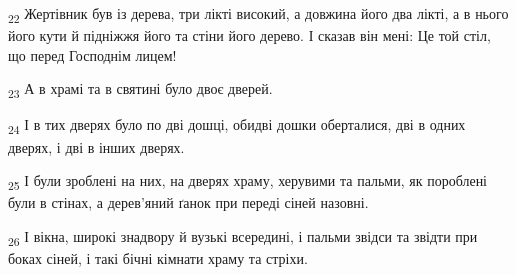 \begin{tcolorbox}
\textsubscript{22} Жертівник був із дерева, три лікті високий, а довжина його два лікті, а в нього його кути й підніжжя його та стіни його дерево. І сказав він мені: Це той стіл, що перед Господнім лицем!
\end{tcolorbox}
\begin{tcolorbox}
\textsubscript{23} А в храмі та в святині було двоє дверей.
\end{tcolorbox}
\begin{tcolorbox}
\textsubscript{24} І в тих дверях було по дві дошці, обидві дошки оберталися, дві в одних дверях, і дві в інших дверях.
\end{tcolorbox}
\begin{tcolorbox}
\textsubscript{25} І були зроблені на них, на дверях храму, херувими та пальми, як пороблені були в стінах, а дерев'яний ґанок при переді сіней назовні.
\end{tcolorbox}
\begin{tcolorbox}
\textsubscript{26} І вікна, широкі знадвору й вузькі всередині, і пальми звідси та звідти при боках сіней, і такі бічні кімнати храму та стріхи.
\end{tcolorbox}
